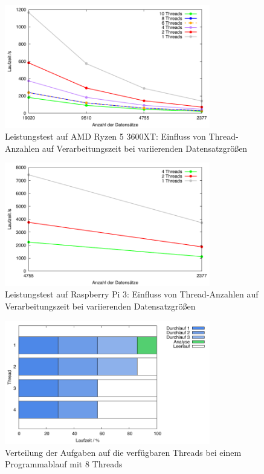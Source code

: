 \begin{figure}[H]
\centering
\includegraphics[width=0.8\textwidth]{../results/plots/3600xt/comp_all_threads.pdf}
\caption{Leistungstest auf AMD Ryzen 5 3600XT: Einfluss von Thread-Anzahlen auf Verarbeitungszeit bei variierenden Datensatzgrößen}
\label{fig:ryzen_benchmark_threads}
\end{figure}

\begin{figure}[H]
\centering
\includegraphics[width=0.8\textwidth]{../results/plots/raspberrypi3/comp_all_threads.pdf}
\caption{Leistungstest auf Raspberry Pi 3: Einfluss von Thread-Anzahlen auf Verarbeitungszeit bei variierenden Datensatzgrößen}
\label{fig:raspi_benchmark_threads}
\end{figure}

\begin{figure}[htbp!]
  \centering
  \includegraphics[width=0.8\textwidth]{../results/plots/timeline/timeline_plot_4threads.pdf}
  \caption{Verteilung der Aufgaben auf die verfügbaren Threads bei einem Programmablauf mit 8 Threads}
  \label{fig:runtime_timeline_4threads}
\end{figure}

